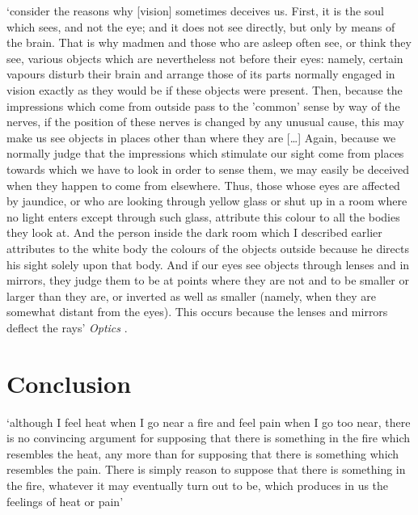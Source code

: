 \documentclass[12pt]{extarticle}
\begin{document}
\begin{multicols*}{3}
‘consider the reasons why [vision]
sometimes deceives us. First, it is the soul which sees, and not the eye;
and it does not see directly, but only by means of the brain. That is why
madmen and those who are asleep often see, or think they see, various
objects which are nevertheless not before their eyes: namely, certain
vapours disturb their brain and arrange those of its parts normally
engaged in vision exactly as they would be if these objects were present.
Then, because the impressions which come from outside pass to the
'common' sense by way of the nerves, if the position of these nerves is
changed by any unusual cause, this may make us see objects in places
other than where they are [\dots] Again, because we normally judge that the 
impressions which stimulate our sight come from places towards which
we have to look in order to sense them, we may easily be deceived when
they happen to come from elsewhere. Thus, those whose eyes are affected
by jaundice, or who are looking through yellow glass or shut up in a
room where no light enters except through such glass, attribute this
colour to all the bodies they look at. And the person inside the dark room
which I described earlier attributes to the white body the colours of the
objects outside because he directs his sight solely upon that body. And if
our eyes see objects through lenses and in mirrors, they judge them to be
at points where they are not and to be smaller or larger than they are, or
inverted as well as smaller (namely, when they are somewhat distant
from the eyes). This occurs because the lenses and mirrors deflect the rays’
\emph{Optics}
\citep[pp.~172--3, AT VI:141--2]{descartes:1985_csm1}.
 
 
 
\section{Conclusion}
 
‘although I feel heat when I go near a fire and feel pain when I go too near,
there is no convincing argument for supposing that there is something in the
fire which resembles the heat, any more than for supposing that there is
something which resembles the pain.
There is simply reason to suppose that
there is something in the fire, whatever it may eventually turn out to be,
which produces in us the feelings of heat or pain’
\citep[p.~58, AT VII:83]{descartes:1985_csm2}
 

\end{multicols*}
\end{document}
